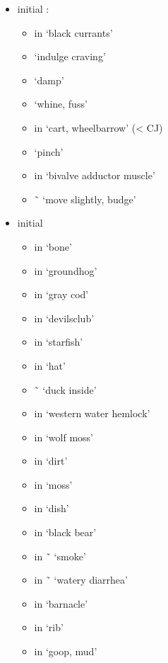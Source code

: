 \begin{multicols}{2}
\begin{itemize}[leftmargin=0em]
\item	initial :
	\begin{itemize}
	\item	{} in  ‘black currants’
	\item	{} ‘indulge craving’
	\item	{} ‘damp’
	\item	{} ‘whine, fuss’
	\item	{} in  ‘cart, wheelbarrow’ (< CJ)
	\item	{} ‘pinch’
	\item	{} in  ‘bivalve adductor muscle’
	\item	{} \~\  ‘move slightly, budge’
	\end{itemize}
\item	initial 
	\begin{itemize}
	\item	{} in  ‘bone’
	\item	{} in  ‘groundhog’
	\item	{} in  ‘gray cod’
	\item	{} in  ‘devilsclub’
	\item	{} in  ‘starfish’
	\item	{} in  ‘hat’
	\item	{} \~\  ‘duck inside’
	\item	{} in  ‘western water hemlock’
	\item	{} in  ‘wolf moss’
	\item	{} in  ‘dirt’
	\item	{} in  ‘moss’
	\item	{} in  ‘dish’
	\item	{} in  ‘black bear’
	\item	{} in  \~\  ‘smoke’
	\item	{} in  \~\  ‘watery diarrhea’
	\item	{} in  ‘barnacle’
	\item	{} in  ‘rib’
	\item	{} in  ‘goop, mud’
	\end{itemize}
\end{itemize}
\end{multicols}

